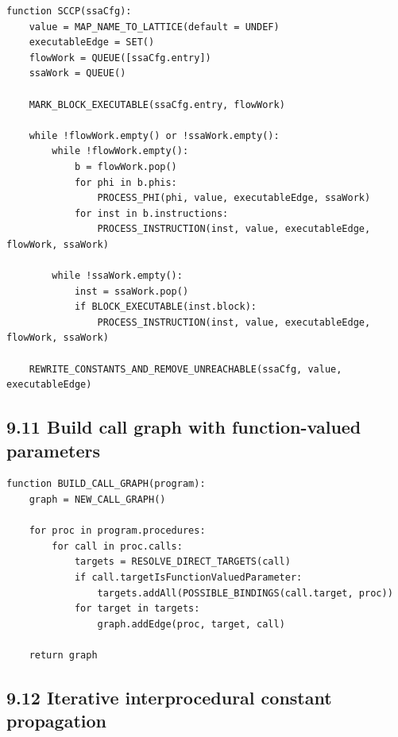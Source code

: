 \documentclass[10pt,letterpaper]{article}
\begin{document}
\begin{verbatim}
function SCCP(ssaCfg):
    value = MAP_NAME_TO_LATTICE(default = UNDEF)
    executableEdge = SET()
    flowWork = QUEUE([ssaCfg.entry])
    ssaWork = QUEUE()

    MARK_BLOCK_EXECUTABLE(ssaCfg.entry, flowWork)

    while !flowWork.empty() or !ssaWork.empty():
        while !flowWork.empty():
            b = flowWork.pop()
            for phi in b.phis:
                PROCESS_PHI(phi, value, executableEdge, ssaWork)
            for inst in b.instructions:
                PROCESS_INSTRUCTION(inst, value, executableEdge, flowWork, ssaWork)

        while !ssaWork.empty():
            inst = ssaWork.pop()
            if BLOCK_EXECUTABLE(inst.block):
                PROCESS_INSTRUCTION(inst, value, executableEdge, flowWork, ssaWork)

    REWRITE_CONSTANTS_AND_REMOVE_UNREACHABLE(ssaCfg, value, executableEdge)
\end{verbatim}

\subsection*{9.11 Build call graph with function-valued parameters}
{}

\begin{verbatim}
function BUILD_CALL_GRAPH(program):
    graph = NEW_CALL_GRAPH()

    for proc in program.procedures:
        for call in proc.calls:
            targets = RESOLVE_DIRECT_TARGETS(call)
            if call.targetIsFunctionValuedParameter:
                targets.addAll(POSSIBLE_BINDINGS(call.target, proc))
            for target in targets:
                graph.addEdge(proc, target, call)

    return graph
\end{verbatim}

\subsection*{9.12 Iterative interprocedural constant propagation}
{}
\end{document}

